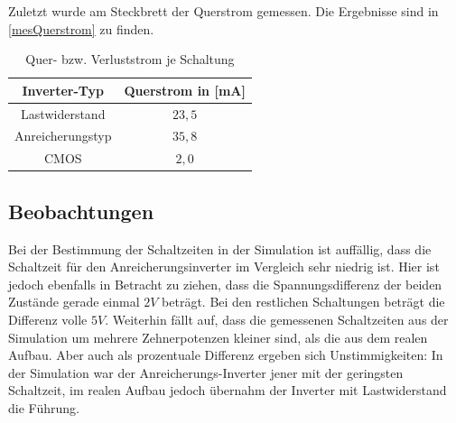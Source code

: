\documentclass[11pt, a4paper]{article}
\begin{document}
Zuletzt wurde am Steckbrett der Querstrom gemessen. Die Ergebnisse sind in \autoref{mesQuerstrom} zu finden.
\begin{table}[h]
\centering
\begin{tabular}{c|c}
Inverter-Typ & Querstrom in [mA] \\ \hline
Lastwiderstand & $23,5$ \\
Anreicherungstyp & $35,8$ \\
CMOS & $2,0$
\end{tabular}
\caption{Quer- bzw. Verluststrom je Schaltung}
\label{mesQuerstrom}
\end{table}
\subsection*{Beobachtungen}
Bei der Bestimmung der Schaltzeiten in der Simulation ist auffällig, dass die Schaltzeit für den Anreicherungsinverter im Vergleich sehr niedrig ist. Hier ist jedoch ebenfalls in Betracht zu ziehen, dass die Spannungsdifferenz der beiden Zustände gerade einmal $2 V$ beträgt. Bei den restlichen Schaltungen beträgt die Differenz volle $5V$.
Weiterhin fällt auf, dass die gemessenen Schaltzeiten aus der Simulation um mehrere Zehnerpotenzen kleiner sind, als die aus dem realen Aufbau. Aber auch als prozentuale Differenz ergeben sich Unstimmigkeiten: In der Simulation war der Anreicherungs-Inverter jener mit der geringsten Schaltzeit, im realen Aufbau jedoch übernahm der Inverter mit Lastwiderstand die Führung.
\end{document}
